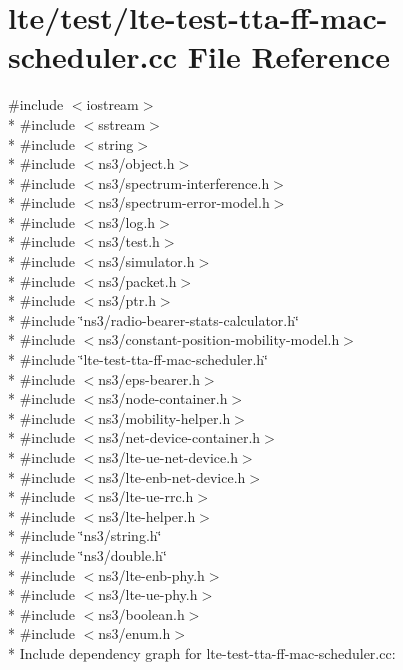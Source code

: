 \hypertarget{lte-test-tta-ff-mac-scheduler_8cc}{}\section{lte/test/lte-\/test-\/tta-\/ff-\/mac-\/scheduler.cc File Reference}
\label{lte-test-tta-ff-mac-scheduler_8cc}
{\ttfamily \#include $<$iostream$>$}\\*
{\ttfamily \#include $<$sstream$>$}\\*
{\ttfamily \#include $<$string$>$}\\*
{\ttfamily \#include $<$ns3/object.\+h$>$}\\*
{\ttfamily \#include $<$ns3/spectrum-\/interference.\+h$>$}\\*
{\ttfamily \#include $<$ns3/spectrum-\/error-\/model.\+h$>$}\\*
{\ttfamily \#include $<$ns3/log.\+h$>$}\\*
{\ttfamily \#include $<$ns3/test.\+h$>$}\\*
{\ttfamily \#include $<$ns3/simulator.\+h$>$}\\*
{\ttfamily \#include $<$ns3/packet.\+h$>$}\\*
{\ttfamily \#include $<$ns3/ptr.\+h$>$}\\*
{\ttfamily \#include \char`\"{}ns3/radio-\/bearer-\/stats-\/calculator.\+h\char`\"{}}\\*
{\ttfamily \#include $<$ns3/constant-\/position-\/mobility-\/model.\+h$>$}\\*
{\ttfamily \#include \char`\"{}lte-\/test-\/tta-\/ff-\/mac-\/scheduler.\+h\char`\"{}}\\*
{\ttfamily \#include $<$ns3/eps-\/bearer.\+h$>$}\\*
{\ttfamily \#include $<$ns3/node-\/container.\+h$>$}\\*
{\ttfamily \#include $<$ns3/mobility-\/helper.\+h$>$}\\*
{\ttfamily \#include $<$ns3/net-\/device-\/container.\+h$>$}\\*
{\ttfamily \#include $<$ns3/lte-\/ue-\/net-\/device.\+h$>$}\\*
{\ttfamily \#include $<$ns3/lte-\/enb-\/net-\/device.\+h$>$}\\*
{\ttfamily \#include $<$ns3/lte-\/ue-\/rrc.\+h$>$}\\*
{\ttfamily \#include $<$ns3/lte-\/helper.\+h$>$}\\*
{\ttfamily \#include \char`\"{}ns3/string.\+h\char`\"{}}\\*
{\ttfamily \#include \char`\"{}ns3/double.\+h\char`\"{}}\\*
{\ttfamily \#include $<$ns3/lte-\/enb-\/phy.\+h$>$}\\*
{\ttfamily \#include $<$ns3/lte-\/ue-\/phy.\+h$>$}\\*
{\ttfamily \#include $<$ns3/boolean.\+h$>$}\\*
{\ttfamily \#include $<$ns3/enum.\+h$>$}\\*
Include dependency graph for lte-\/test-\/tta-\/ff-\/mac-\/scheduler.cc\+:
